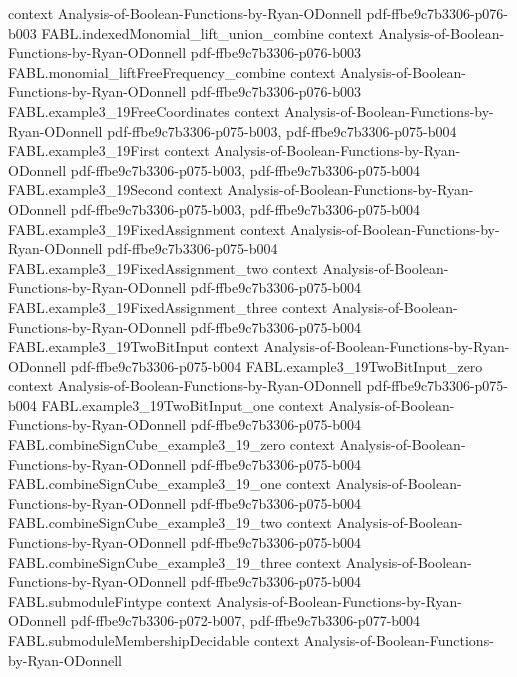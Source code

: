 \begin{theorem}
  {context}
  {Analysis-of-Boolean-Functions-by-Ryan-ODonnell}
  {pdf-ffbe9c7b3306-p076-b003}
\proofstep
  {FABL.indexedMonomial_lift_union_combine}
  {context}
  {Analysis-of-Boolean-Functions-by-Ryan-ODonnell}
  {pdf-ffbe9c7b3306-p076-b003}
\proofstep
  {FABL.monomial_liftFreeFrequency_combine}
  {context}
  {Analysis-of-Boolean-Functions-by-Ryan-ODonnell}
  {pdf-ffbe9c7b3306-p076-b003}
\proofstep
  {FABL.example3_19FreeCoordinates}
  {context}
  {Analysis-of-Boolean-Functions-by-Ryan-ODonnell}
  {pdf-ffbe9c7b3306-p075-b003,
    pdf-ffbe9c7b3306-p075-b004}
\proofstep
  {FABL.example3_19First}
  {context}
  {Analysis-of-Boolean-Functions-by-Ryan-ODonnell}
  {pdf-ffbe9c7b3306-p075-b003,
    pdf-ffbe9c7b3306-p075-b004}
\proofstep
  {FABL.example3_19Second}
  {context}
  {Analysis-of-Boolean-Functions-by-Ryan-ODonnell}
  {pdf-ffbe9c7b3306-p075-b003,
    pdf-ffbe9c7b3306-p075-b004}
\proofstep
  {FABL.example3_19FixedAssignment}
  {context}
  {Analysis-of-Boolean-Functions-by-Ryan-ODonnell}
  {pdf-ffbe9c7b3306-p075-b004}
\proofstep
  {FABL.example3_19FixedAssignment_two}
  {context}
  {Analysis-of-Boolean-Functions-by-Ryan-ODonnell}
  {pdf-ffbe9c7b3306-p075-b004}
\proofstep
  {FABL.example3_19FixedAssignment_three}
  {context}
  {Analysis-of-Boolean-Functions-by-Ryan-ODonnell}
  {pdf-ffbe9c7b3306-p075-b004}
\proofstep
  {FABL.example3_19TwoBitInput}
  {context}
  {Analysis-of-Boolean-Functions-by-Ryan-ODonnell}
  {pdf-ffbe9c7b3306-p075-b004}
\proofstep
  {FABL.example3_19TwoBitInput_zero}
  {context}
  {Analysis-of-Boolean-Functions-by-Ryan-ODonnell}
  {pdf-ffbe9c7b3306-p075-b004}
\proofstep
  {FABL.example3_19TwoBitInput_one}
  {context}
  {Analysis-of-Boolean-Functions-by-Ryan-ODonnell}
  {pdf-ffbe9c7b3306-p075-b004}
\proofstep
  {FABL.combineSignCube_example3_19_zero}
  {context}
  {Analysis-of-Boolean-Functions-by-Ryan-ODonnell}
  {pdf-ffbe9c7b3306-p075-b004}
\proofstep
  {FABL.combineSignCube_example3_19_one}
  {context}
  {Analysis-of-Boolean-Functions-by-Ryan-ODonnell}
  {pdf-ffbe9c7b3306-p075-b004}
\proofstep
  {FABL.combineSignCube_example3_19_two}
  {context}
  {Analysis-of-Boolean-Functions-by-Ryan-ODonnell}
  {pdf-ffbe9c7b3306-p075-b004}
\proofstep
  {FABL.combineSignCube_example3_19_three}
  {context}
  {Analysis-of-Boolean-Functions-by-Ryan-ODonnell}
  {pdf-ffbe9c7b3306-p075-b004}
\proofstep
  {FABL.submoduleFintype}
  {context}
  {Analysis-of-Boolean-Functions-by-Ryan-ODonnell}
  {pdf-ffbe9c7b3306-p072-b007,
    pdf-ffbe9c7b3306-p077-b004}
\proofstep
  {FABL.submoduleMembershipDecidable}
  {context}
  {Analysis-of-Boolean-Functions-by-Ryan-ODonnell}

\end{theorem}

